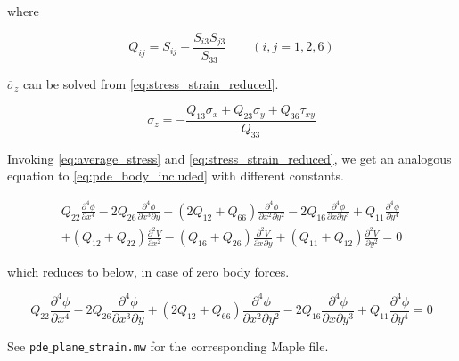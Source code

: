 where \cite{Lekhnitskii1968}

\begin{equation*}
    Q_{ij} = S_{ij} - \dfrac{S_{i3} S_{j3}}{S_{33}} \quad\quad (i, j = 1, 2, 6)
\end{equation*}

$\overline{\sigma}_z$ can be solved from \cref{eq:stress_strain_reduced}.

\begin{equation*}
    \sigma_z = -\dfrac{Q_{13} \sigma_x + Q_{23} \sigma_y + Q_{36} \tau_{xy}}{Q_{33}}
\end{equation*}

Invoking \cref{eq:average_stress} and \cref{eq:stress_strain_reduced}, we get an analogous equation to \cref{eq:pde_body_included} with different constants.

\begin{multline*}
    Q_{22} \frac{\partial^4 \phi}{\partial x^4} - 2 Q_{26} \frac{\partial^4 \phi}{\partial x^3 \partial y} + (2 Q_{12} + Q_{66}) \frac{\partial^4 \phi}{\partial x^2 \partial y^2} - 2 Q_{16} \frac{\partial^4 \phi}{\partial x \partial y^3} + Q_{11} \frac{\partial^4 \phi}{\partial y^4} \\ + (Q_{12} + Q_{22}) \frac{\partial^2 \overline{V}}{\partial x^2} - (Q_{16} + Q_{26}) \frac{\partial^2 \overline{V}}{\partial x \partial y}  + (Q_{11} + Q_{12}) \frac{\partial^2 \overline{V}}{\partial y^2} = 0
\end{multline*}

which reduces to below, in case of zero body forces.

\begin{equation*}
    Q_{22} \frac{\partial^4 \phi}{\partial x^4} - 2 Q_{26} \frac{\partial^4 \phi}{\partial x^3 \partial y} + (2 Q_{12} + Q_{66}) \frac{\partial^4 \phi}{\partial x^2 \partial y^2} - 2 Q_{16} \frac{\partial^4 \phi}{\partial x \partial y^3} + Q_{11} \frac{\partial^4 \phi}{\partial y^4} = 0
\end{equation*}

See \texttt{pde$\_$plane$\_$strain.mw} for the corresponding Maple file. 